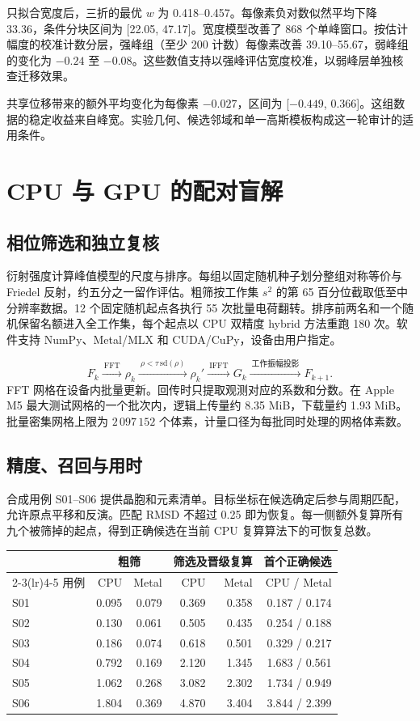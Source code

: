 \documentclass[11pt,a4paper,fontset=fandol,UTF8]{ctexart}
\newcommand{\capline}[1]{\medskip{\small\sffamily\color{muted}#1}\par\smallskip}
\begin{document}
只拟合宽度后，三折的最优 \(w\) 为 0.418–0.457。每像素负对数似然平均下降 33.36，条件分块区间为 [22.05, 47.17]。宽度模型改善了 868 个单峰窗口。按估计幅度的校准计数分层，强峰组（至少 200 计数）每像素改善 39.10–55.67，弱峰组的变化为 \(-0.24\) 至 \(-0.08\)。这些数值支持以强峰评估宽度校准，以弱峰层单独核查迁移效果。

共享位移带来的额外平均变化为每像素 \(-0.027\)，区间为 [\(-0.449\), 0.366]。这组数据的稳定收益来自峰宽。实验几何、候选邻域和单一高斯模板构成这一轮审计的适用条件。

\clearpage
\section{CPU 与 GPU 的配对盲解}

\subsection{相位筛选和独立复核}
衍射强度计算峰值模型的尺度与排序。每组以固定随机种子划分整组对称等价与 Friedel 反射，约五分之一留作评估。粗筛按工作集 \(s^2\) 的第 65 百分位截取低至中分辨率数据。12 个固定随机起点各执行 55 次批量电荷翻转。排序前两名和一个随机保留名额进入全工作集，每个起点以 CPU 双精度 hybrid 方法重跑 180 次。软件支持 NumPy、Metal/MLX 和 CUDA/CuPy，设备由用户指定。

\[
  F_k \xrightarrow{\ \mathrm{FFT}\ } \rho_k
      \xrightarrow{\ \rho<\tau\,\mathrm{sd}(\rho)\ } \rho_k'
      \xrightarrow{\ \mathrm{IFFT}\ } G_k
      \xrightarrow{\ \text{工作振幅投影}\ }F_{k+1}.
\]
FFT 网格在设备内批量更新。回传时只提取观测对应的系数和分数。在 Apple M5 最大测试网格的一个批次内，逻辑上传量约 8.35 MiB，下载量约 1.93 MiB。批量密集网格上限为 \(2\,097\,152\) 个体素，计量口径为每批同时处理的网格体素数。

\subsection{精度、召回与用时}
合成用例 S01–S06 提供晶胞和元素清单。目标坐标在候选确定后参与周期匹配，允许原点平移和反演。匹配 RMSD 不超过 \qty{0.25}{\angstromunit} 即为恢复。每一侧额外复算所有九个被筛掉的起点，得到正确候选在当前 CPU 复算算法下的可恢复总数。

\capline{表 3\quad Apple M5 配对结果，墙钟秒}
\noindent\begin{tabular*}{\linewidth}{@{\extracolsep{\fill}}lrrrrr@{}}
\toprule
&\multicolumn{2}{c}{粗筛}&\multicolumn{2}{c}{筛选及晋级复算}& 首个正确候选\\
\cmidrule(lr){2-3}\cmidrule(lr){4-5}
用例 & CPU & Metal & CPU & Metal & CPU / Metal\\
\midrule
S01 & 0.095 & 0.079 & 0.369 & 0.358 & 0.187 / 0.174\\
S02 & 0.130 & 0.061 & 0.505 & 0.435 & 0.254 / 0.188\\
S03 & 0.186 & 0.074 & 0.618 & 0.501 & 0.329 / 0.217\\
S04 & 0.792 & 0.169 & 2.120 & 1.345 & 1.683 / 0.561\\
S05 & 1.062 & 0.268 & 3.082 & 2.302 & 1.734 / 0.949\\
S06 & 1.804 & 0.369 & 4.870 & 3.404 & 3.844 / 2.399\\
\bottomrule
\end{tabular*}
\end{document}
